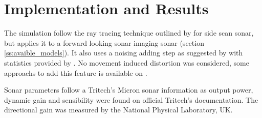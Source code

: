 
\section{Implementation and Results}

The simulation follow the ray tracing technique outlined by
\citet{bell1997simulation} for side scan sonar, but applies it to a forward
looking sonar imaging sonar (section \ref{ss:avaible_models}). It also uses a
noising adding step as suggested by \citet{coiras2009gpu} with statistics
provided by \citet{maussang2007mean}.
No movement induced distortion was considered, some approachs to add this
feature is available on \citet{bell1999techniques,borawski2005sonar}.

Sonar parameters follow a Tritech's Micron sonar\cite{micronsonar}
information as output power, dynamic gain and sensibility were found on
official Tritech's documentation\cite{micronsonar,micronmodem}. The directional
gain was measured by the National Physical Laboratory, UK.
